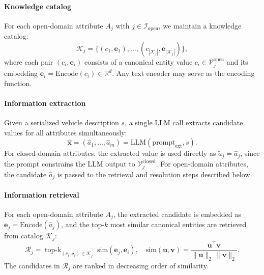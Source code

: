 \documentclass[conference]{IEEEtran}
\begin{document}
\paragraph{Knowledge catalog}
For each open-domain attribute $A_j$ with
$j \in \mathcal{I}_{\text{open}}$, we maintain a knowledge catalog:
\begin{equation}
\mathcal{K}_j = \{(c_1, \mathbf{e}_1), \dots,
(c_{|\mathcal{K}_j|}, \mathbf{e}_{|\mathcal{K}_j|})\},
\end{equation}
where each pair $(c_i, \mathbf{e}_i)$ consists of a canonical entity
value $c_i \in \mathcal{V}_j^{\text{open}}$ and its embedding
$\mathbf{e}_i = \text{Encode}(c_i) \in \mathbb{R}^{d}$. Any text
encoder may serve as the encoding function.


\paragraph{Information extraction}
Given a serialized vehicle description $s$, a single LLM call extracts
candidate values for all attributes simultaneously:
\begin{equation}
\hat{\mathbf{x}} = (\hat{a}_1, \dots, \hat{a}_m) =
\text{LLM}(\text{prompt}_{\text{ext}}, s).
\end{equation}
For closed-domain attributes, the extracted value is used directly as
$\tilde{a}_j = \hat{a}_j$, since the prompt constrains the LLM output to
$\mathcal{V}_j^{\text{closed}}$. For open-domain attributes, the
candidate $\hat{a}_j$ is passed to the retrieval and resolution steps
described below.

\paragraph{Information retrieval}
For each open-domain attribute $A_j$, the extracted candidate is embedded
as $\mathbf{e}_j = \text{Encode}(\hat{a}_j)$, and the top-$k$ most
similar canonical entities are retrieved from catalog $\mathcal{K}_j$:
\begin{equation}
\mathcal{R}_j = \operatorname{top\text{-}k}_{(c_i, \mathbf{e}_i)
\in \mathcal{K}_j}\;
\text{sim}(\mathbf{e}_j, \mathbf{e}_i), \quad
\text{sim}(\mathbf{u}, \mathbf{v}) =
\frac{\mathbf{u}^\top \mathbf{v}}
{\|\mathbf{u}\|_2 \, \|\mathbf{v}\|_2}.
\end{equation}
The candidates in $\mathcal{R}_j$ are ranked in decreasing order of
similarity.
\end{document}

